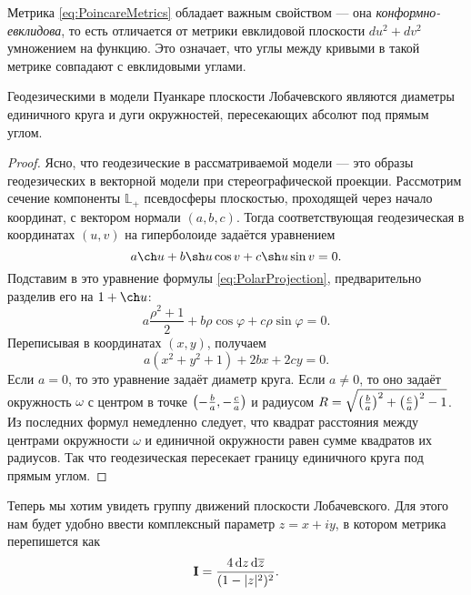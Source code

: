Метрика \eqref{eq:PoincareMetrics} обладает важным свойством --- она \textit{конформно-евклидова}, то есть отличается от метрики евклидовой плоскости $du^2 + dv^2$ умножением на функцию. Это означает, что углы между кривыми в такой метрике совпадают с евклидовыми углами.

\begin{theorem}
	Геодезическими в модели Пуанкаре плоскости Лобачевского являются диаметры единичного круга и дуги окружностей, пересекающих абсолют под прямым углом.
\end{theorem}

\begin{proof}
	Ясно, что геодезические в рассматриваемой модели --- это образы геодезических в векторной модели при стереографической проекции. Рассмотрим сечение компоненты $\mathbb{L}_+$ псевдосферы плоскостью, проходящей через начало координат, с вектором нормали $(a, b, c)$. Тогда соответствующая геодезическая в координатах $(u, v)$ на гиперболоиде задаётся уравнением
	\[
		a\ch u + b\sh u\cos v + c\sh u\sin v= 0.
	\]
	Подставим в это уравнение формулы \eqref{eq:PolarProjection}, предварительно разделив его на $1 + \ch u$:
	\[
		a\frac{\rho^2 + 1}{2} + b\rho\cos\varphi + c\rho\sin\varphi = 0.
	\]
	Переписывая в координатах $(x, y)$, получаем
	\[
		a(x^2 + y^2 + 1) + 2bx + 2cy = 0.
	\]
	Если $a = 0$, то это уравнение задаёт диаметр круга. Если $a \ne 0$, то оно задаёт окружность $\omega$ с центром в точке $\left(-\frac{b}{a}, -\frac{c}{a}\right)$ и радиусом $R = \sqrt{\left(\frac{b}{a}\right)^2 + \left(\frac{c}{a}\right)^2 - 1}$. Из последних формул немедленно следует, что квадрат расстояния между центрами окружности $\omega$ и единичной окружности равен сумме квадратов их радиусов. Так что геодезическая пересекает границу единичного круга под прямым углом.
\end{proof}

Теперь мы хотим увидеть группу движений плоскости Лобачевского. Для этого нам будет удобно ввести комплексный параметр $z = x + iy$, в котором метрика перепишется как
\begin{equation} \label{eq:zMetrics}
	\boldsymbol{\operatorname{I}} = \frac{4\mathop{}\!\mathrm{d} z\mathop{}\!\mathrm{d}\overline{z}}{(1 - |z|^2)^2}.
\end{equation}

